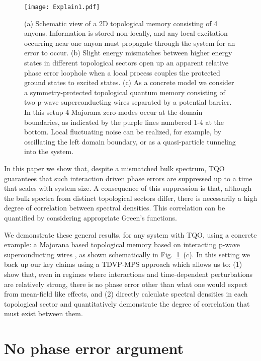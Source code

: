 \documentclass[aps,pra,floatfix,footinbib,longbibliography,twocolumn,superscriptaddress, preprintnumbers, nobibnotes]{revtex4-1}
\begin{document}
\begin{figure}
    \centering
    \texttt{[image: Explain1.pdf]}
    \caption{(a) Schematic view of a 2D topological memory consisting of 4 anyons. Information is stored non-locally, and any local excitation occurring near one anyon must propagate through the system for an error to occur. (b) Slight energy mismatches between higher energy states in different topological sectors open up an apparent relative phase error loophole when a local process couples the protected ground states to excited states. (c) As a concrete model we consider a symmetry-protected topological quantum memory consisting of two p-wave superconducting wires separated by a potential barrier. In this setup 4 Majorana zero-modes occur at the domain boundaries, as indicated by the purple lines numbered 1-4 at the bottom. Local fluctuating noise can be realized, for example, by oscillating the left domain boundary, or as a quasi-particle tunneling into the system.}
    \label{fig:Wiresetup}
\end{figure}
%

In this paper we show that, despite a mismatched bulk spectrum, TQO guarantees that such interaction driven phase errors are suppressed up to a time that scales with system size. A consequence of this suppression is that, although the bulk spectra from distinct topological sectors differ, there is necessarily a high degree of correlation between spectral densities. This correlation can be quantified by considering appropriate Green’s functions.%

We demonstrate these general results, for any system with TQO, using a concrete example: a Majorana based topological memory based on interacting p-wave superconducting wires \cite{Fu2008,Lutchyn2010,Oreg2010,Sau2011,AliceaNat2011}, as shown schematically in Fig.~\ref{fig:Wiresetup}~(c). In this setting we back up our key claims using a TDVP-MPS approach \cite{HaegemanTDVP, Paeckel2019} which allows us to: (1) show that, even in regimes where interactions and time-dependent perturbations are relatively strong, there is no phase error other than what one would expect from mean-field like effects, and (2) directly calculate spectral densities in each topological sector and quantitatively demonstrate the degree of correlation that must exist between them. 

\section{No phase error argument}
\end{document}
